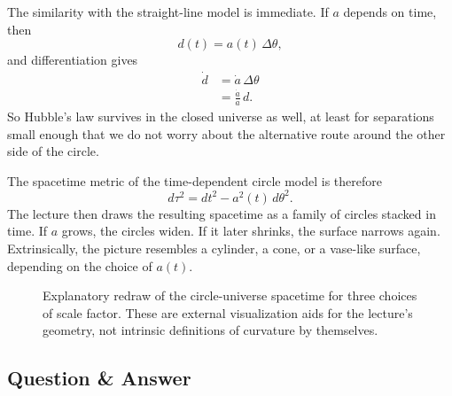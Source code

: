 The similarity with the straight-line model is immediate. If \(a\) depends on time, then
\begin{equation}
d(t)=a(t)\,\Delta\theta,
\end{equation}
and differentiation gives
\begin{align}
\dot d &= \dot a\,\Delta\theta \\
       &= \frac{\dot a}{a}\,d.
\end{align}
So Hubble's law survives in the closed universe as well, at least for separations small enough that we do not worry about the alternative route around the other side of the circle.

The spacetime metric of the time-dependent circle model is therefore
\begin{equation}
d\tau^2 = dt^2 - a^2(t)\,d\theta^2.
\end{equation}
The lecture then draws the resulting spacetime as a family of circles stacked in time. If \(a\) grows, the circles widen. If it later shrinks, the surface narrows again. Extrinsically, the picture resembles a cylinder, a cone, or a vase-like surface, depending on the choice of \(a(t)\).

\begin{figure}
\centering
{}
\caption{Explanatory redraw of the circle-universe spacetime for three choices of scale factor. These are external visualization aids for the lecture's geometry, not intrinsic definitions of curvature by themselves.}
\end{figure}

\subsection{Question \& Answer}

